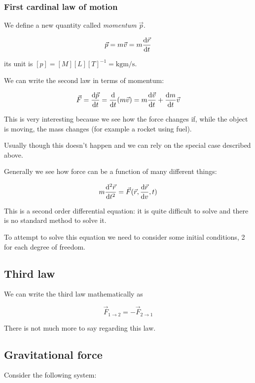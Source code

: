 \documentclass[14pt]{extarticle}
\begin{document}
\subsubsection{First cardinal law of motion}

We define a new quantity called \textit{momentum} $\vec p$.

$$
  \vec p = m \vec v = m \dv{\vec r}{t}
$$

its unit is $[p] = [M][L][T]^{-1} = \si{\kilogram \meter \per \second}$.

We can write the second law in terms of momentum:

$$
  \vec F = \dv{\vec p}{t} = \dv{t} (m \vec v) = m \dv{\vec v}{t} + \dv{m}{t} \vec v
$$

This is very interesting because we see how the force changes if, while the object is moving, the mass changes (for example a rocket using fuel).

Usually though this doesn't happen and we can rely on the special case described above.

Generally we see how force can be a function of many different things:

$$
  m \dv[2]{\vec r}{t} = \vec F(\vec r, \dv{\vec r}{v}, t)
$$

This is a second order differential equation: it is quite difficult to solve and there is no standard method to solve it.

To attempt to solve this equation we need to consider some initial conditions, 2 for each degree of freedom.

\subsection{Third law}

We can write the third law mathematically as

$$
  \vec{F}_{1 \to 2} = - \vec{F}_{2 \to 1}
$$

There is not much more to say regarding this law.

\subsection{Gravitational force}

Consider the following system:

\begin{center}
\end{center}
\end{document}
